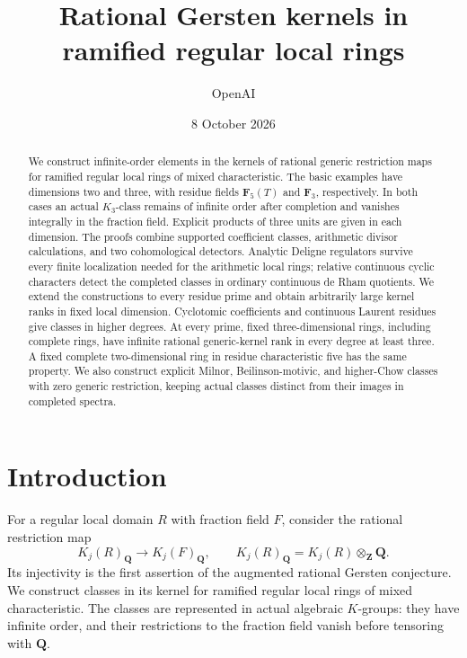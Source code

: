 \documentclass[11pt,a4paper]{amsart}
\title[Rational Gersten kernels]{Rational Gersten kernels in ramified regular local rings}
\author{OpenAI}
\date{8 October 2026}
\numberwithin{equation}{section}
\theoremstyle{definition}
\theoremstyle{remark}
\newcommand{\Q}{\mathbf Q}
\newcommand{\Z}{\mathbf Z}
\begin{document}
\begin{abstract}

We construct infinite-order elements in the kernels of rational generic
restriction maps for ramified regular local rings of mixed
characteristic. The basic examples have dimensions two and three,
with residue fields $\mathbf F_5(T)$ and $\mathbf F_3$, respectively.
In both cases an actual $K_3$-class remains of infinite order after
completion and vanishes integrally in the fraction field. Explicit
products of three units are given in each dimension. The proofs combine
supported coefficient classes, arithmetic divisor calculations, and
two cohomological detectors. Analytic Deligne regulators survive every
finite localization needed for the arithmetic local rings; relative
continuous cyclic characters detect the completed classes in ordinary
continuous de Rham quotients. We extend the constructions to every
residue prime and obtain arbitrarily large kernel ranks in fixed local
dimension. Cyclotomic coefficients and continuous Laurent residues give
classes in higher degrees. At every prime, fixed three-dimensional
rings, including complete rings, have infinite rational generic-kernel
rank in every degree at least three. A fixed complete two-dimensional
ring in residue characteristic five has the same property. We also
construct explicit Milnor, Beilinson-motivic, and higher-Chow classes
with zero generic restriction, keeping actual classes distinct from
their images in completed spectra.


\end{abstract}
\maketitle

\setcounter{tocdepth}{1}
\tableofcontents


\section{Introduction}\label{sec:introduction}

For a regular local domain $R$ with fraction field $F$, consider the
rational restriction map
\[
 K_j(R)_{\Q}\longrightarrow K_j(F)_{\Q},
 \qquad K_j(R)_{\Q}=K_j(R)\otimes_{\Z}\Q.
\]
Its injectivity is the first assertion of the augmented rational
Gersten conjecture. We construct classes in its kernel for ramified
regular local rings of mixed characteristic. The classes are represented
in actual algebraic $K$-groups: they have infinite order, and their
restrictions to the fraction field vanish before tensoring with $\Q$.
\end{document}
